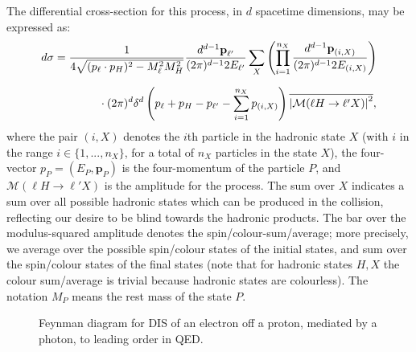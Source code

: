 \documentclass[withindex,glossary]{cam-thesis}
\renewcommand{\vec}[1]{\textbf{#1}} %
\begin{document}
\noindent The differential cross-section for this process, in $d$ spacetime dimensions, may be expressed as:
\begin{align}
\label{eq:diff_xsec_dis}
d\sigma &= \frac{1}{4 \sqrt{(p_{\ell} \cdot p_H)^2 - M_{\ell}^2 M_H^2}} \frac{d^{d-1}\vec{p}_{\ell'}}{(2\pi)^{d-1} 2E_{\ell'}} \sum_{X} \left(\prod_{i=1}^{n_X} \frac{d^{d-1} \vec{p}_{(i,X)}}{(2\pi)^{d-1} 2E_{(i,X)}}\right) \notag \\[1.5ex]
& \qquad\qquad \cdot (2\pi)^d \delta^d\left(p_\ell + p_H - p_{\ell'} - \sum_{i=1}^{n_X} p_{(i,X)}\right) \overline{\left| \mathcal{M}(\ell H \rightarrow \ell' X) \right|^2},
\end{align}
where the pair $(i,X)$ denotes the $i$th particle in the hadronic state $X$ (with $i$ in the range $i \in \{1,...,n_X\}$, for a total of $n_X$ particles in the state $X$), the four-vector $p_{P} = (E_{P}, \vec{p}_{P})$ is the four-momentum of the particle $P$, and $\mathcal{M}(\ell H \rightarrow \ell' X)$ is the amplitude for the process. The sum over $X$ indicates a sum over all possible hadronic states which can be produced in the collision, reflecting our desire to be blind towards the hadronic products. The bar over the modulus-squared amplitude denotes the spin/colour-sum/average; more precisely, we average over the possible spin/colour states of the initial states, and sum over the spin/colour states of the final states (note that for hadronic states $H,X$ the colour sum/average is trivial because hadronic states are colourless). The notation $M_{P}$ means the rest mass of the state $P$.

\begin{figure}[H]
\centering
{}
\caption{Feynman diagram for DIS of an electron off a proton, mediated by a photon, to leading order in QED.}
\label{fig:photondis}
\end{figure}
\end{document}

